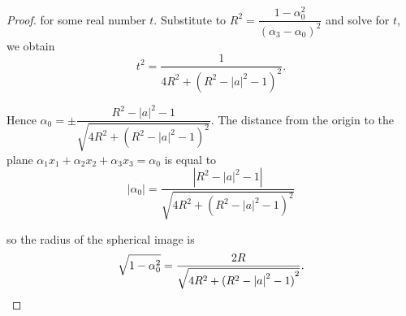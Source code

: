 \begin{proof}
	for some real number \( t \). Substitute to \( R^{2} = \dfrac{1 - \alpha_{0}^{2}}{{(\alpha_{3} - \alpha_{0})}^{2}} \) and solve for \( t \), we obtain
	\[
		t^{2} = \dfrac{1}{4R^{2} + {(R^{2} - {\left\vert a \right\vert}^{2} - 1)}^{2}}.
	\]

	Hence \( \alpha_{0} = \pm\dfrac{R^{2} - {\left\vert a \right\vert}^{2} - 1}{\sqrt{4R^{2} + {(R^{2} - {\left\vert a \right\vert}^{2} - 1)}^{2}}} \). The distance from the origin to the plane \( \alpha_{1}x_{1} + \alpha_{2}x_{2} + \alpha_{3}x_{3} = \alpha_{0} \) is equal to
	\[
		\left\vert \alpha_{0} \right\vert = \dfrac{\left\vert R^{2} - {\left\vert a \right\vert}^{2} - 1\right\vert}{\sqrt{4R^{2} + {(R^{2} - {\left\vert a \right\vert}^{2} - 1)}^{2}}}
	\]

	so the radius of the spherical image is
	\[
		\sqrt{1 - \alpha_{0}^{2}} = \dfrac{2R}{\sqrt{4R^{2} + {(R^{2} - {\left\vert a \right\vert}^{2} - 1)}^{2}}}. \qedhere
	\]
\end{proof}

